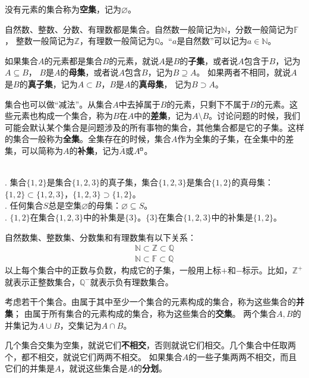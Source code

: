 \documentclass[12pt,UTF8,fontset=none]{ctexbook}
\begin{document}
没有元素的集合称为\textbf{空集}，记为$\varnothing$。

自然数、整数、分数、有理数都是集合。自然数一般简记为$\mathbb{N}$，分数一般简记为$\mathbb{F}$，
整数一般简记为$\mathbb{Z}$，有理数一般简记为$\mathbb{Q}$。“$a$是自然数”可以记为$a\in\mathbb{N}$。

如果集合$A$的元素都是集合$B$的元素，就说$A$是$B$的\textbf{子集}，或者说$A$包含于$B$，记为$A\subseteq B$，
$B$是$A$的\textbf{母集}，或者说$A$包含$B$，记为$B\supseteq A$。
如果两者不相同，就说$A$是$B$的\textbf{真子集}，记为$A\subset B$，$B$是$A$的\textbf{真母集}，
记为$B\supset A$。

集合也可以做“减法”。从集合$A$中去掉属于$B$的元素，只剩下不属于$B$的元素。这些元素也构成一个集合，称为$B$在$A$中的\textbf{差集}，记为$A\setminus B$。讨论问题的时候，我们可能会默认某个集合是问题涉及的所有事物的集合，其他集合都是它的子集。这样的集合一般称为\textbf{全集}。全集存在的时候，集合$A$作为全集的子集，在全集中的差集，可以简称为$A$的\textbf{补集}，记为$\bar{A}$或$A^{\bu}$。

\begin{ex}\label{ex:2-0-10}
    \mbox{} \\ 
    . 集合$\{1,2\}$是集合$\{1,2,3\}$的真子集，集合$\{1,2,3\}$是集合$\{1,2\}$的真母集：$\{1,2\}\subset \{1,2,3\}$，$\{1,2,3\}\supset \{1,2\}$。\\
    . 任何集合$S$总是空集$\varnothing$的母集：$\varnothing \subseteq S$。\\
    . $\{1,2\}$在集合$\{1,2,3\}$中的补集是$\{3\}$。$\{3\}$在集合$\{1,2,3\}$中的补集是$\{1,2\}$。
\end{ex}

自然数集、整数集、分数集和有理数集有以下关系：
\begin{align*}
    \mathbb{N}\subset\mathbb{Z}\subset\mathbb{Q}  \\
    \mathbb{N}\subset\mathbb{F}\subset\mathbb{Q} 
\end{align*}
以上每个集合中的正数与负数，构成它的子集，一般用上标$+$和$-$标示。比如，$\mathbb{Z}^+$就表示正整数集合，$\mathbb{Q}^-$就表示负有理数集合。

考虑若干个集合。由属于其中至少一个集合的元素构成的集合，称为这些集合的\textbf{并集}；
由属于所有集合的元素构成的集合，称为这些集合的\textbf{交集}。
两个集合$A, B$的并集记为$A\cup B$，交集记为$A\cap B$。

几个集合交集为空集，就说它们\textbf{不相交}，否则就说它们相交。几个集合中任取两个，都不相交，就说它们两两不相交。
如果集合$A$的一些子集两两不相交，而且它们的并集是$A$，就说这些集合是$A$的\textbf{分划}。
\end{document}
